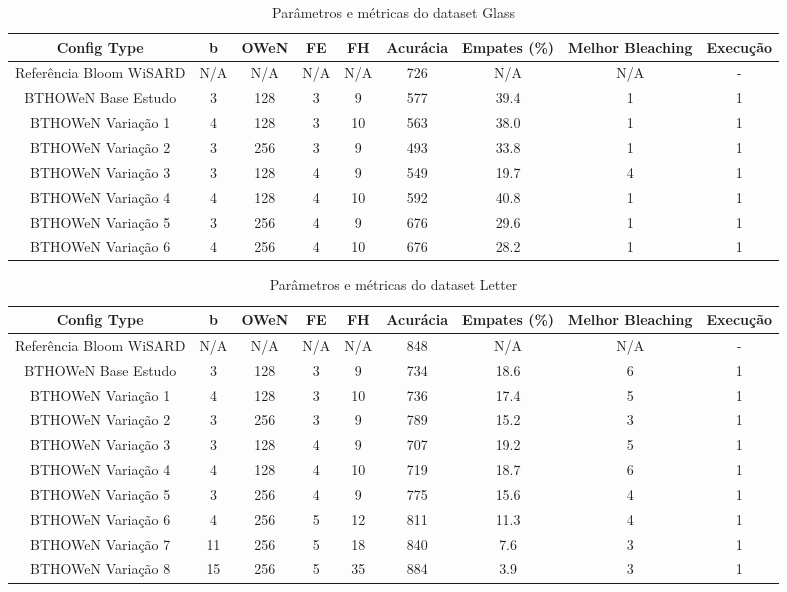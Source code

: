 \documentclass{article}
\begin{document}
{\begin{longtable}{|c|c|c|c|c|c|c|c|c|}
\caption{Parâmetros e métricas do dataset Glass} \\
\hline
\textbf{Config Type} & \textbf{b} & \textbf{OWeN} & \textbf{FE} & \textbf{FH} & \textbf{Acurácia} & \textbf{Empates (\%)} & \textbf{Melhor Bleaching} & \textbf{Execução} \\
\hline
Referência Bloom WiSARD & N/A & N/A & N/A & N/A & 726 & N/A & N/A & - \\
\hline
BTHOWeN Base Estudo & 3 & 128 & 3 & 9 & 577 & 39.4 & 1 & 1 \\
\hline
BTHOWeN Variação 1 & 4 & 128 & 3 & 10 & 563 & 38.0 & 1 & 1 \\
\hline
BTHOWeN Variação 2 & 3 & 256 & 3 & 9 & 493 & 33.8 & 1 & 1 \\
\hline
BTHOWeN Variação 3 & 3 & 128 & 4 & 9 & 549 & 19.7 & 4 & 1 \\
\hline
BTHOWeN Variação 4 & 4 & 128 & 4 & 10 & 592 & 40.8 & 1 & 1 \\
\hline
BTHOWeN Variação 5 & 3 & 256 & 4 & 9 & 676 & 29.6 & 1 & 1 \\
\hline
BTHOWeN Variação 6 & 4 & 256 & 4 & 10 & 676 & 28.2 & 1 & 1 \\
\hline
\end{longtable}

\begin{longtable}{|c|c|c|c|c|c|c|c|c|}
\caption{Parâmetros e métricas do dataset Letter} \\
\hline
\textbf{Config Type} & \textbf{b} & \textbf{OWeN} & \textbf{FE} & \textbf{FH} & \textbf{Acurácia} & \textbf{Empates (\%)} & \textbf{Melhor Bleaching} & \textbf{Execução} \\
\hline
Referência Bloom WiSARD & N/A & N/A & N/A & N/A & 848 & N/A & N/A & - \\
\hline
BTHOWeN Base Estudo & 3 & 128 & 3 & 9 & 734 & 18.6 & 6 & 1 \\
\hline
BTHOWeN Variação 1 & 4 & 128 & 3 & 10 & 736 & 17.4 & 5 & 1 \\
\hline
BTHOWeN Variação 2 & 3 & 256 & 3 & 9 & 789 & 15.2 & 3 & 1 \\
\hline
BTHOWeN Variação 3 & 3 & 128 & 4 & 9 & 707 & 19.2 & 5 & 1 \\
\hline
BTHOWeN Variação 4 & 4 & 128 & 4 & 10 & 719 & 18.7 & 6 & 1 \\
\hline
BTHOWeN Variação 5 & 3 & 256 & 4 & 9 & 775 & 15.6 & 4 & 1 \\
\hline
BTHOWeN Variação 6 & 4 & 256 & 5 & 12 & 811 & 11.3 & 4 & 1 \\
\hline
BTHOWeN Variação 7 & 11 & 256 & 5 & 18 & 840 & 7.6 & 3 & 1 \\
\hline
BTHOWeN Variação 8 & 15 & 256 & 5 & 35 & 884 & 3.9 & 3 & 1 \\
\hline
\end{longtable}

}
\end{document}
